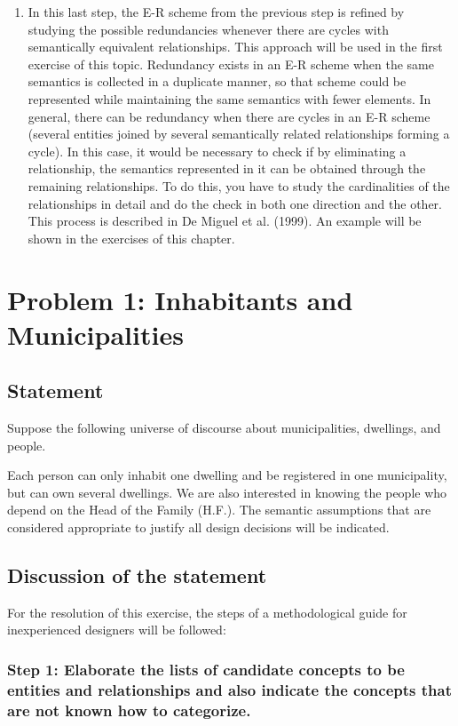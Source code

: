 \documentclass{article}
\begin{document}
\begin{enumerate}
    \item In this last step, the E-R scheme from the previous step is refined by studying the possible redundancies whenever there are cycles with semantically equivalent relationships.  This approach will be used in the first exercise of this topic.  Redundancy exists in an E-R scheme when the same semantics is collected in a duplicate manner, so that scheme could be represented while maintaining the same semantics with fewer elements.  In general, there can be redundancy when there are cycles in an E-R scheme (several entities joined by several semantically related relationships forming a cycle).  In this case, it would be necessary to check if by eliminating a relationship, the semantics represented in it can be obtained through the remaining relationships.  To do this, you have to study the cardinalities of the relationships in detail and do the check in both one direction and the other.  This process is described in De Miguel et al. (1999).  An example will be shown in the exercises of this chapter.
\end{enumerate}

\section{Problem 1:
Inhabitants and Municipalities
}

\subsection{Statement}

Suppose the following universe of discourse about municipalities, dwellings, and people.

Each person can only inhabit one dwelling and be registered in one municipality, but can own several dwellings.  We are also interested in knowing the people who depend on the Head of the Family (H.F.).  The semantic assumptions that are considered appropriate to justify all design decisions will be indicated.

\subsection{Discussion of the statement}

For the resolution of this exercise, the steps of a methodological guide for inexperienced designers will be followed:

\subsubsection*{Step 1: Elaborate the lists of candidate concepts to be entities and relationships and also indicate the concepts that are not known how to categorize.}
\end{document}
